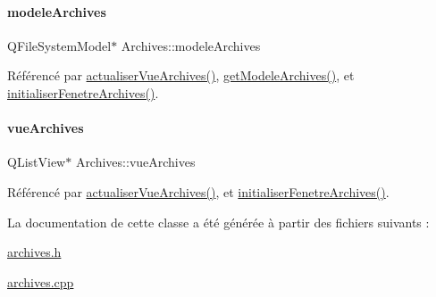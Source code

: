 \paragraph{\texorpdfstring{modele\+Archives}{modeleArchives}}
{\footnotesize\ttfamily Q\+File\+System\+Model$\ast$ Archives\+::modele\+Archives\hspace{0.3cm}{\ttfamily [private]}}



Référencé par \hyperlink{class_archives_a380ac387d773b07ea5138347dbaca65a}{actualiser\+Vue\+Archives()}, \hyperlink{class_archives_ab5a55ac2e810cfdec3ce19af14087ceb}{get\+Modele\+Archives()}, et \hyperlink{class_archives_a1842ebad3721929949bc07be5144b79c}{initialiser\+Fenetre\+Archives()}.

\mbox{\label{class_archives_a28fe566dcac396079d064460b17293b9}} 
\paragraph{\texorpdfstring{vue\+Archives}{vueArchives}}
{\footnotesize\ttfamily Q\+List\+View$\ast$ Archives\+::vue\+Archives\hspace{0.3cm}{\ttfamily [private]}}



Référencé par \hyperlink{class_archives_a380ac387d773b07ea5138347dbaca65a}{actualiser\+Vue\+Archives()}, et \hyperlink{class_archives_a1842ebad3721929949bc07be5144b79c}{initialiser\+Fenetre\+Archives()}.



La documentation de cette classe a été générée à partir des fichiers suivants \+:\begin{DoxyCompactItemize}
\item 
\hyperlink{archives_8h}{archives.\+h}\item 
\hyperlink{archives_8cpp}{archives.\+cpp}\end{DoxyCompactItemize}
